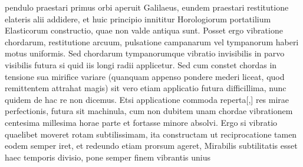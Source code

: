                 \vspace*{8mm}
                \pstart
                \noindent
                 [59 r\textsuperscript{o}] 
                \pend
                \pstart 
                \normalsize
           \begin{center} 
           \end{center}  
           \pend 
           \pstart \vspace{0,5em} \noindent {}\protect{}pendulo\protect{} praestari primus orbi aperuit Galilaeus\protect{}, eundem praestari restitutione elateris\protect{} alii addidere, et huic principio innititur Horologiorum\protect{} portatilium Elasticorum constructio, quae non valde antiqua sunt.  Posset ergo vibratione chordarum, restitutione arcuum\protect{}, pulsatione campanarum\protect{} vel tympanorum\protect{} haberi motus uniformis\protect{}. Sed chordarum tympanorumque\protect{} vibratio invisibilis in parvo visibilis futura si quid iis longi radii applicetur. Sed cum constet chordas in tensione sua mirifice variare (quanquam appenso pondere mederi liceat, quod remittentem attrahat magis) sit vero etiam applicatio futura difficillima, nunc quidem de hac re non dicemus. Etsi applicatione
           \pend
           \newpage
           \pstart\noindent commoda reperta[,] res mirae perfectionis, futura sit machinula, cum non dubitem unam chordae vibrationem centesima millesima horae parte  et fortasse minore absolvi. Ergo si vibratio quaelibet moveret rotam subtilissimam, ita constructam ut reciprocatione tamen eodem  semper iret, et redeundo etiam prorsum ageret, %
{} Mirabilis subtilitatis esset haec temporis divisio, pone semper finem vibrantis unius %
